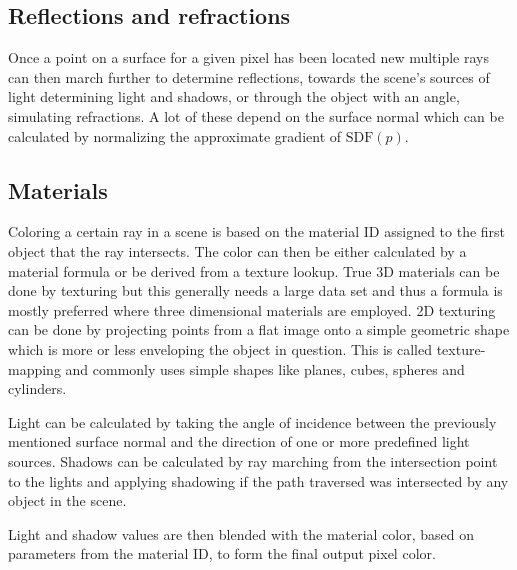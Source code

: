 			\subsection{Reflections and refractions}
		
				Once a point on a surface for a given pixel has been located
				new multiple rays can then march further to determine
				reflections, towards the scene's sources of light determining
				light and shadows, or through the object with an angle,
				simulating refractions. A lot of these depend on the surface
				normal which can be calculated by normalizing the approximate
				gradient of $\text{SDF}(p)$. 
		
			\subsection{Materials}
				Coloring a certain ray in a scene is based on the material ID
				assigned to the first object that the ray intersects. The color
				can then be either calculated by a material formula or be 
				derived from a texture lookup. True 3D materials can be done by
				texturing but this generally needs a large data set and thus a 
				formula is mostly preferred where three dimensional materials 
				are employed. 2D texturing can be done by projecting points from
				a flat image onto a simple geometric shape  which is more or less 
				enveloping the object in question. This is called texture-mapping 
				and commonly uses simple shapes like planes, cubes, spheres and 
				cylinders. 
				
				Light can be calculated by taking the angle of incidence between
				the previously mentioned surface normal and the direction of one 
				or more predefined light sources. Shadows can be calculated by 
				ray marching from the intersection point to the lights and 
				applying shadowing if the path traversed was intersected by any
				object in the scene. 
				
				Light and shadow values are then blended with the material color,
				based on parameters from the material ID, to form the final 
				output pixel color.
						
		

